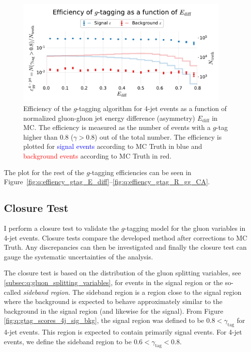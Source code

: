 \begin{figure}
  \centerfloat
  \includegraphics[width=0.95\textwidth, trim=10 10 10 45, clip, page=1]{figures/quarks/efficiency_events-down_sample=1.00-ML_vars=vertex-selection=b-ejet_min=4-n_iter_RS_lgb=99-n_iter_RS_xgb=9-cdot_cut=0.90-version=19-njet=4.pdf}
  \caption[$g$-Tagging Efficiency for 4-Jet Events in MC as a Function of the Normalized Gluon-Gluon Jet Energy Difference Asymmetry $E_\mathrm{diff}$]
          {Efficiency of the $g$-tagging algorithm for 4-jet events as a function of normalized gluon-gluon jet energy difference (asymmetry) $E_\mathrm{diff}$  in MC. The efficiency is measured as the number of events with a $g$-tag higher than 0.8 ($\gamma > 0.8$) out of the total number. The efficiency is plotted for \textcolor{blue}{signal events} according to MC Truth in blue and \textcolor{red}{background events} according to MC Truth in red.
          } 
  \label{fig:q:effiency_gtag_E_diff_non_appendix}
\end{figure}

The plot for the rest of the $g$-tagging efficiencies can be seen in Figure~\ref{fig:q:effiency_gtag_E_diff}--\ref{fig:q:effiency_gtag_R_gg_CA}. 

\subsection{Closure Test}
\label{subsec:q:gluon_splitting_closure}

I perform a closure test to validate the $g$-tagging model for the gluon variables in 4-jet events. Closure tests compare the developed method after corrections to MC Truth. Any discrepancies can then be investigated and finally the closure test can gauge the systematic uncertainties of the analysis. 

The closure test is based on the distribution of the gluon splitting variables, see \autoref{subsec:q:gluon_splitting_variables}, for events in the signal region or the so-called \emph{sideband region}. The sideband region is a region close to the signal region where the background is expected to behave approximately similar to the background in the signal region (and likewise for the signal). From Figure \ref{fig:q:gtag_scores_4j_sig_bkg}, the signal region was defined to be $0.8 < \gamma_\mathrm{tag}$ for 4-jet events. This region is expected to contain primarily signal events. For 4-jet events, we define the sideband region to be $0.6 < \gamma_\mathrm{tag} < 0.8$. 

